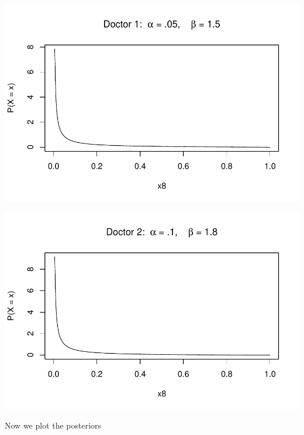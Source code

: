 \documentclass[12pt]{article}\usepackage[]{graphicx}\usepackage[]{color}
\makeatletter
\def\maxwidth{ %
  \ifdim\Gin@nat@width>\linewidth
    \linewidth
  \else
    \Gin@nat@width
  \fi
}
\newenvironment{knitrout}{}{} %
\makeatother
\begin{document}
\begin{enumerate}
\begin{enumerate}[label = (\alph*)]
\begin{knitrout}
\color{fgcolor}

{\centering \includegraphics[width=\maxwidth]{figure/plot8a-1} 

}



\end{knitrout}

\begin{knitrout}
\color{fgcolor}

{\centering \includegraphics[width=\maxwidth]{figure/plot8b-1} 

}



\end{knitrout}

Now we plot the posteriors


\end{enumerate}
\end{enumerate}
\end{document}
